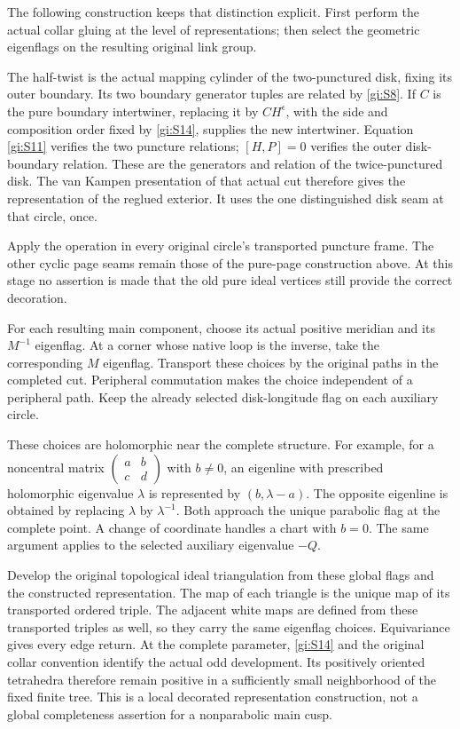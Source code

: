 The following construction keeps that distinction explicit.
First perform the actual collar gluing at the level of
representations; then select the geometric eigenflags on the
resulting original link group.

The half-twist is the actual mapping cylinder of the two-punctured
disk, fixing its outer boundary. Its two boundary generator
tuples are related by \eqref{gi:S8}. If \(C\) is the pure boundary
intertwiner, replacing it by \(CH^\epsilon\), with the side
and composition order fixed by \eqref{gi:S14}, supplies the new
intertwiner. Equation \eqref{gi:S11} verifies the two puncture relations;
\([H,P]=0\) verifies the outer disk-boundary relation. These
are the generators and relation of the twice-punctured disk.
The van Kampen presentation of that actual cut therefore gives
the representation of the reglued exterior. It uses the one
distinguished disk seam at that circle, once.

Apply the operation in every original circle's transported
puncture frame. The other cyclic page seams remain those of
the pure-page construction above. At this stage no assertion is made that the old
pure ideal vertices still provide the correct decoration.

For each resulting main component, choose its actual positive
meridian and its \(M^{-1}\) eigenflag. At a corner whose
native loop is the inverse, take the corresponding \(M\)
eigenflag. Transport these choices by the original paths in the
completed cut. Peripheral commutation makes the choice independent
of a peripheral path. Keep the already selected disk-longitude
flag on each auxiliary circle.

These choices are holomorphic near the complete structure.
For example, for a noncentral matrix
\(\left(\begin{smallmatrix}a&b\\c&d\end{smallmatrix}\right)\)
with \(b\ne0\), an eigenline with prescribed holomorphic
eigenvalue \(\lambda\) is represented by
\((b,\lambda-a)\). The opposite eigenline is obtained by
replacing \(\lambda\) by \(\lambda^{-1}\).
Both approach the unique parabolic flag at the complete point.
A change of coordinate handles a chart with \(b=0\).
The same argument applies to the selected auxiliary eigenvalue
\(-Q\).

Develop the original topological ideal triangulation from these
global flags and the constructed representation. The map of
each triangle is the unique map of its transported ordered
triple. The adjacent white maps are defined from these transported
triples as well, so they carry the same eigenflag choices.
Equivariance gives every edge return. At the complete parameter,
\eqref{gi:S14} and the original collar convention identify the actual odd
development. Its positively oriented tetrahedra therefore remain
positive in a sufficiently small neighborhood of the fixed
finite tree. This is a local decorated representation
construction, not a global completeness assertion for a
nonparabolic main cusp.

